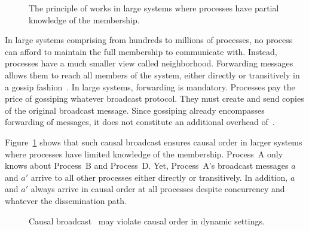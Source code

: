 \begin{figure}
  \begin{center}
    
    \caption{\label{fig:disseminationtree}The principle of
      \cite{friedman2004causal} works in large systems where processes have
      partial knowledge of the membership.}
  \end{center}
\end{figure}



In large systems comprising from hundreds to millions of processes, no process
can afford to maintain the full membership to communicate with. Instead,
processes have a much smaller view called neighborhood. Forwarding messages
allows them to reach all members of the system, either directly or transitively
in a gossip fashion~\cite{demers1987epidemic,birman1999bimodal}. In
large systems, forwarding is mandatory.  Processes pay the price of gossiping
whatever broadcast protocol. They must create and send copies of the original
broadcast message. Since gossiping already encompasses forwarding of messages,
it does not constitute an additional overhead of~\cite{friedman2004causal}.

Figure~\ref{fig:disseminationtree} shows that such causal broadcast ensures
causal order in larger systems where processes have limited knowledge of the
membership.  Process~A only knows about Process~B and Process~D.  Yet,
Process~A's broadcast messages $a$ and $a'$ arrive to all other processes either
directly or transitively. In addition, $a$ and $a'$ always arrive in causal
order at all processes despite concurrency and whatever the dissemination path.

\begin{figure*}
  \begin{center}
    \hspace{20pt}
    \hspace{20pt}
    \hspace{20pt}
    \hspace{20pt}
    \caption{\label{fig:preventiveproblem}Causal
      broadcast~\cite{friedman2004causal} may violate causal order in dynamic
      settings.}
  \end{center}
\end{figure*}


